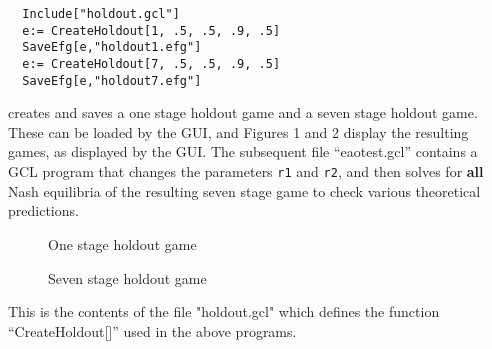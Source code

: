 \begin{verbatim}
  Include["holdout.gcl"]
  e:= CreateHoldout[1, .5, .5, .9, .5]
  SaveEfg[e,"holdout1.efg"]
  e:= CreateHoldout[7, .5, .5, .9, .5]
  SaveEfg[e,"holdout7.efg"]
\end{verbatim}

\noindent
creates and saves a one stage holdout game and a seven stage holdout
game. These can be loaded by the GUI, and Figures 1 and 2 display the
resulting games, as displayed by the GUI.  The subsequent file
``eaotest.gcl'' contains a GCL program that changes the parameters
\verb+r1+ and \verb+r2+, and then solves for {\bf all} Nash equilibria
of the resulting seven stage game to check various theoretical predictions.

\begin{figure}[htp]
\caption{One stage holdout game}
\end{figure}
\begin{figure}[htp]
\caption{Seven stage holdout game}
\end{figure}

\newpage
\noindent
This is the contents of the file "holdout.gcl" which defines the
function ``CreateHoldout[]'' used in the above programs.

